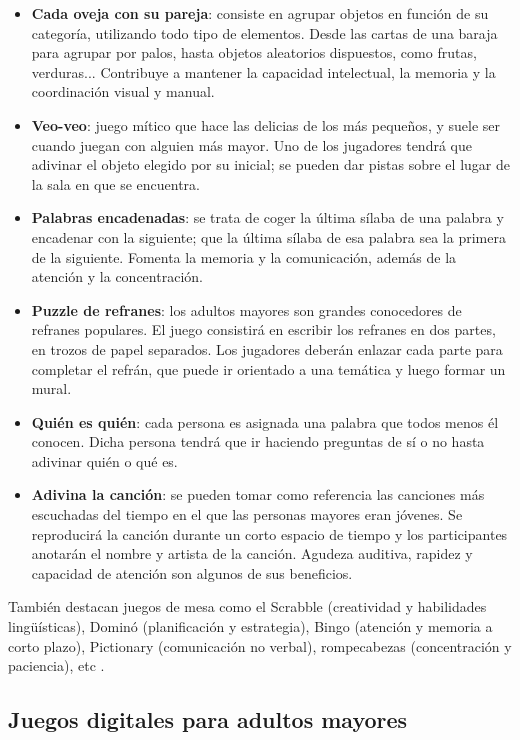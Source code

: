 \begin{itemize}[leftmargin=1.5cm, topsep=2.2pt, itemsep=0.5pt]
    \item \textbf{Cada oveja con su pareja}: 
    consiste en agrupar objetos en función de su categoría, utilizando todo tipo de elementos. Desde las cartas de una baraja para agrupar por palos, hasta objetos aleatorios dispuestos, como frutas, verduras... Contribuye a mantener la capacidad intelectual, la memoria y la coordinación visual y manual.
    \item \textbf{Veo-veo}:
    juego mítico que hace las delicias de los más pequeños, y suele ser cuando juegan con alguien más mayor. Uno de los jugadores tendrá que adivinar el objeto elegido por su inicial; se pueden dar pistas sobre el lugar de la sala en que se encuentra.
    \item \textbf{Palabras encadenadas}:
    se trata de coger la última sílaba de una palabra y encadenar con la siguiente; que la última sílaba de esa palabra sea la primera de la siguiente. Fomenta la memoria y la comunicación, además de la atención y la concentración.
    \item \textbf{Puzzle de refranes}: 
    los adultos mayores son grandes conocedores de refranes populares. El juego consistirá en escribir los refranes en dos partes, en trozos de papel separados. Los jugadores deberán enlazar cada parte para completar el refrán, que puede ir orientado a una temática y luego formar un mural.
    \item \textbf{Quién es quién}:
    cada persona es asignada una palabra que todos menos él conocen. Dicha persona tendrá que ir haciendo preguntas de sí o no hasta adivinar quién o qué es.
    \item \textbf{Adivina la canción}:
    se pueden tomar como referencia las canciones más escuchadas del tiempo en el que las personas mayores eran jóvenes. Se reproducirá la canción durante un corto espacio de tiempo y los participantes anotarán el nombre y artista de la canción. Agudeza auditiva, rapidez y capacidad de atención son algunos de sus beneficios.
\end{itemize}

También destacan juegos de mesa como el Scrabble (creatividad y habilidades lingüísticas), Dominó (planificación y estrategia), Bingo (atención y memoria a corto plazo), Pictionary (comunicación no verbal), rompecabezas (concentración y paciencia), etc \parencite{juegos-mesa}.

\subsection{Juegos digitales para adultos mayores}

